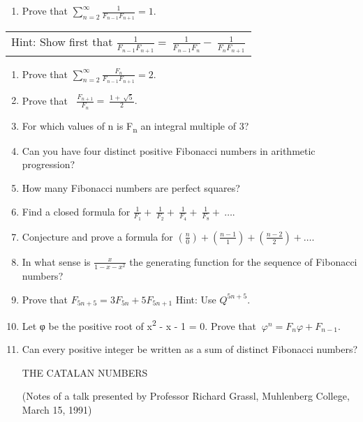 \documentclass[10pt,letter]{article}
\renewenvironment{quote}
  {\begin{tabular}{|p{13cm}}}
  {\end{tabular}}
\begin{document}
\begin{enumerate}
\def\labelenumi{\arabic{enumi}.}

\item
  Prove that \(\sum_{n = 2}^{\infty}\frac{1}{F_{n - 1}F_{n + 1}} = 1.\)

\end{enumerate}

\begin{quote}
Hint: Show first that
\(\frac{1}{F_{n - 1}F_{n + 1}} = \ \frac{1}{F_{n - 1}F_{n}} - \ \frac{1}{F_{n}F_{n + 1}}\)

\end{quote}

\begin{enumerate}
\def\labelenumi{\arabic{enumi}.}

\item
  Prove that
  \(\sum_{n = 2}^{\infty}\frac{F_{n}}{F_{n - 1}F_{n + 1}} = 2.\)
\item
  Prove that
  \(\operatorname{}\frac{F_{n + 1}}{F_{n}} = \ \frac{1 + \ \sqrt{5}}{2}.\)
\item
  For which values of n is F\textsubscript{n} an integral multiple of 3?
\item
  Can you have four distinct positive Fibonacci numbers in arithmetic
  progression?
\item
  How many Fibonacci numbers are perfect squares?
\item
  Find a closed formula for
  \(\frac{1}{F_{1}} + \ \frac{1}{F_{2}} + \ \frac{1}{F_{4}} + \ \frac{1}{F_{8}} + \ \ldots.\)
\item
  Conjecture and prove a formula for
  \(\left( \frac{n}{0} \right) + \left( \frac{n - 1}{1} \right) + \left( \frac{n - 2}{2} \right) + \ldots.\)
\item
  In what sense is \(\frac{x}{1 - x - x^{2}}\) the generating function
  for the sequence of Fibonacci numbers?
\item
  Prove that \(F_{5n + 5} = 3F_{5n} + 5F_{5n + 1}\)
  Hint: Use \(Q^{5n + 5}\).
\item
  Let φ be the positive root of x\textsuperscript{2} - x - 1 = 0. Prove
  that \(\ \varphi^{n} = F_{n}\varphi + F_{n - 1}\).
\item
  Can every positive integer be written as a sum of distinct Fibonacci
  numbers?

THE CATALAN NUMBERS

(Notes of a talk presented by Professor Richard Grassl, Muhlenberg
  College, March 15, 1991)

\end{enumerate}
\end{document}
